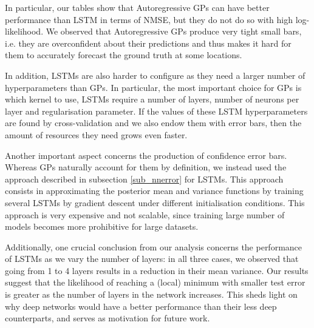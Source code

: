 \documentclass[pdftex,10pt,a4paper,journal]{article}
\theoremstyle{definition}
\theoremstyle{remark}
\begin{document}
\begin{multicols}{2}
\par In particular, our tables show that Autoregressive GPs can have better performance than LSTM in terms of NMSE, but they do not do so with high log-likelihood. We observed that Autoregressive GPs produce very tight small bars, i.e. they are overconfident about their predictions and thus makes it hard for them to accurately forecast the ground truth at some locations.

\par In addition, LSTMs are also harder to configure as they need a larger number of hyperparameters than GPs. In particular, the most important choice for GPs is which kernel to use, LSTMs require a number of layers, number of neurons per layer and regularisation parameter. If the values of these LSTM hyperparameters are found by cross-validation and we also endow them with error bars, then the amount of resources they need grows even faster.

\par Another important aspect concerns the production of confidence error bars. Whereas GPs naturally account for them by definition, we instead used the approach described in subsection \ref{sub_nnerror} for LSTMs. This approach consists in approximating the posterior mean and variance functions by training several LSTMs by gradient descent under different initialisation conditions. This approach is very expensive and not scalable, since training large number of models becomes more prohibitive for large datasets.

\par Additionally, one crucial conclusion from our analysis concerns the performance of LSTMs as we vary the number of layers: in all three cases, we observed that going from 1 to 4 layers results in a reduction in their mean variance. Our results suggest that the likelihood of reaching a (local) minimum with smaller test error is greater as the number of layers in the network increases. This sheds light on why deep networks would have a better performance than their less deep counterparts, and serves as motivation for future work.


\end{multicols}
\end{document}
